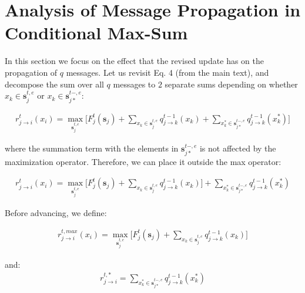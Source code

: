 
\newpage
\appendix

\section{Analysis of Message Propagation in Conditional Max-Sum}\label{sec:cond_ms_message_prop}
    
In this section we focus on the effect that the revised update has on the propagation of $q$ messages.
Let us revisit Eq. 4 (from the main text), and decompose the sum over all $q$ messages to $2$ separate sums depending on whether $x_k \in \mathbf{s}_j^{t,e}$ or $x_k \in \mathbf{s}_{j*}^{t-,e}$:

\begin{align}\label{eq:cms_r_t_p_dec}
    r^t_{j \rightarrow i} (x_i) = \max_{\mathbf{s}_j^{t,e}} \Big  \lbrack F^t_j(\mathbf{s}_j) + \sum_{x_k \in \mathbf{s}_j^{t,e}} q^{t-1}_{j \rightarrow k}(x_k) + \sum_{x_k^* \in \mathbf{s}_{j*}^{t-,e}} q^{t-1}_{j \rightarrow k}(x_k^*) \Big \rbrack
\end{align}

\noindent where the summation term with the elements in $\mathbf{s}_{j*}^{t-,e}$ is not affected by the maximization operator. Therefore, we can place it outside the max operator:


\begin{align}\label{eq:cms_r_t_p_dec_out}
    r^t_{j \rightarrow i} (x_i) = \max_{\mathbf{s}_j^{t,e}} \Big  \lbrack F^t_j(\mathbf{s}_j) + \sum_{x_k \in \mathbf{s}_j^{t,e}} q^{t-1}_{j \rightarrow k}(x_k) \Big \rbrack + \sum_{x_k^* \in \mathbf{s}_{j*}^{t-,e}} q^{t-1}_{j \rightarrow k}(x_k^*) 
\end{align}

\noindent Before advancing, we define: 

\begin{eqnarray}\label{eq:r_t_max}
    r^{t,max}_{j \rightarrow i} (x_i) = \max_{\mathbf{s}_j^{t,e}} \Big  \lbrack F^t_j(\mathbf{s}_j) + \sum_{x_k \in \mathbf{s}_j^{t,e}} q^{t-1}_{j \rightarrow k}(x_k) \Big \rbrack 
\end{eqnarray}

\noindent and:
\begin{eqnarray}\label{eq:r_t_star}
    r^{t,*}_{j \rightarrow i} =  \sum_{x_k^* \in \mathbf{s}_{j*}^{t-,e}} q^{t-1}_{j \rightarrow k}(x_k^*) 
\end{eqnarray}


